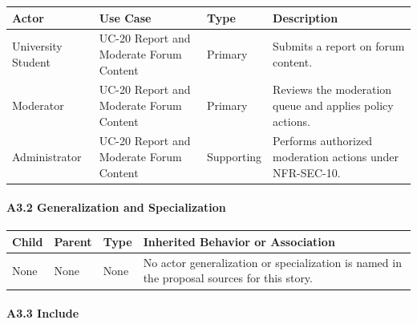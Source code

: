 \documentclass[12pt]{article}
\renewcommand{\baselinestretch}{1.5}
\begin{document}
\begingroup
\small
\renewcommand{\baselinestretch}{1.0}\selectfont
\renewcommand{\arraystretch}{1.15}
\setlength{\tabcolsep}{6pt}
\begin{longtable}{|>{\raggedright\arraybackslash}p{}|>{\raggedright\arraybackslash}p{}|>{\raggedright\arraybackslash}p{}|>{\raggedright\arraybackslash}p{}|}
\hline
\textbf{Actor} & \textbf{Use Case} & \textbf{Type} & \textbf{Description} \\ \hline
\endhead
University Student & UC-20 Report and Moderate Forum Content & Primary & Submits a report on forum content. \\ \hline
Moderator & UC-20 Report and Moderate Forum Content & Primary & Reviews the moderation queue and applies policy actions. \\ \hline
Administrator & UC-20 Report and Moderate Forum Content & Supporting & Performs authorized moderation actions under NFR-SEC-10. \\ \hline
\end{longtable}
\endgroup
\par\medskip

\hypertarget{sec:a3-2-generalization-and-specialization}{}
\paragraph*{A3.2 Generalization and Specialization}
\par\medskip

\begingroup
\small
\renewcommand{\baselinestretch}{1.0}\selectfont
\renewcommand{\arraystretch}{1.15}
\setlength{\tabcolsep}{6pt}
\begin{longtable}{|>{\raggedright\arraybackslash}p{}|>{\raggedright\arraybackslash}p{}|>{\raggedright\arraybackslash}p{}|>{\raggedright\arraybackslash}p{}|}
\hline
\textbf{Child} & \textbf{Parent} & \textbf{Type} & \textbf{Inherited Behavior or Association} \\ \hline
\endhead
None & None & None & No actor generalization or specialization is named in the proposal sources for this story. \\ \hline
\end{longtable}
\endgroup
\par\medskip

\hypertarget{sec:a3-3-include}{}
\paragraph*{A3.3 Include}
\par\medskip
\end{document}
